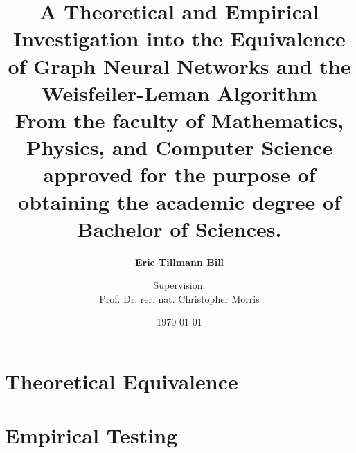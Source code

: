 \documentclass[11pt, dvipsnames, DIV=12]{scrreprt} %
\title{A Theoretical and Empirical Investigation into the Equivalence of Graph Neural Networks and the Weisfeiler-Leman Algorithm\\
\vspace{20pt}\small{\normalfont From the faculty of Mathematics, Physics, and Computer Science approved for the purpose of obtaining the academic degree of Bachelor of Sciences.}
}
\author{\textbf{Eric Tillmann Bill}}
\affil{\vspace{100pt}}
\author{Supervision:\\Prof. Dr. rer. nat. Christopher Morris}
\affil{Informatik 6\\RWTH Aachen University}
\date{\vspace{30pt}\today}
\theoremstyle{definition}
\begin{document}

\maketitle
\clearpage %

\begingroup
  \pagestyle{empty}
  \null
  \newpage
\endgroup



\clearpage


\cleardoubleoddstandardpage
\tableofcontents

\cleardoubleoddstandardpage
{}




\part{Theoretical Equivalence}\label{part1}



\part{Empirical Testing}\label{part2}


\cleardoubleoddstandardpage
{}


\cleardoubleoddstandardpage

\end{document}
